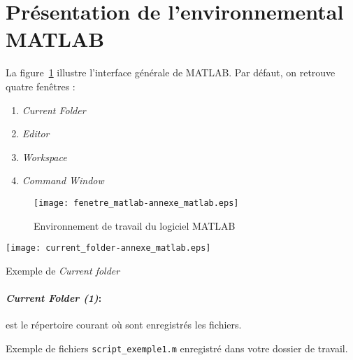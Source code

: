 \section{Présentation de l'environnemental MATLAB}
La figure~\ref{fig-envMATLAB} illustre l'interface générale de MATLAB. 
Par défaut, on retrouve quatre fenêtres :
\begin{enumerate}
    \item \emph{Current Folder}
    \item \emph{Editor}
    \item \emph{Workspace}
    \item \emph{Command Window}
\end{enumerate}
\begin{figure}[!h]
    \centering
    \texttt{[image: fenetre\_matlab-annexe\_matlab.eps]}
    \caption{Environnement de travail du logiciel MATLAB \label{fig-envMATLAB}}    
\end{figure}
\clearpage
\begin{marginfigure}
    \centering
    \texttt{[image: current\_folder-annexe\_matlab.eps]}
    \caption{Exemple de \emph{Current folder}\label{fig-CF}}    
\end{marginfigure}
\paragraph{\emph{Current Folder (1)}: } est le répertoire courant où sont 
enregistrés les fichiers. 

Exemple de fichiers 
\texttt{script\_exemple1.m} enregistré dans votre dossier de travail.

